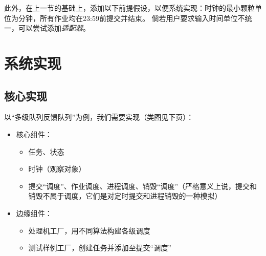 \documentclass[12pt, a4paper, UTF8]{ctexart}
\begin{document}
此外，在上一节的基础上，添加以下前提假设，以便系统实现：时钟的最小颗粒单位为分钟，所有作业均在23:59前提交并结束。
倘若用户要求输入时间单位不统一，可以尝试添加\emph{适配器}。

\section{系统实现}

\subsection{核心实现}
以“多级队列反馈队列”为例，我们需要实现（类图见下页）：
\begin{itemize}
    \item 核心组件：
          \begin{itemize}
              \item 任务、状态
              \item 时钟（观察对象）
              \item 提交“调度”、作业调度、进程调度、销毁“调度”（严格意义上说，提交和销毁不属于调度，它们是对定时提交和进程销毁的一种模拟）
          \end{itemize}
    \item 边缘组件：
          \begin{itemize}
              \item 处理机工厂，用不同算法构建各级调度
              \item 测试样例工厂，创建任务并添加至提交“调度”
          \end{itemize}
\end{itemize}
\end{document}
